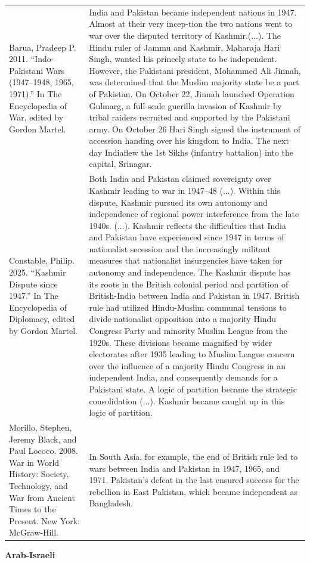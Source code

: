 {\begin{longtable}{p{}p{}}
Barua, Pradeep P. 2011. “Indo-Pakistani Wars (1947–1948, 1965, 1971).” In The Encyclopedia of War, edited by Gordon Martel. & India and Pakistan became independent nations in 1947. Almost at their very incep-tion the two nations went to war over the disputed territory of Kashmir.(...).
The Hindu ruler of Jammu and Kashmir, Maharaja Hari Singh, wanted his princely state to be independent. However, the Pakistani president, Mohammed Ali Jinnah, was determined that the Muslim majority state be a part of Pakistan. On October 22, Jinnah launched Operation Gulmarg, a full-scale guerilla invasion of Kashmir by tribal raiders recruited and supported by the Pakistani army. On October 26 Hari Singh signed the instrument of accession handing over his kingdom to India. The next day Indiaflew the 1st Sikhs (infantry battalion) into the capital, Srinagar.
\\
Constable, Philip. 2025. “Kashmir Dispute since 1947.” In The Encyclopedia of Diplomacy, edited by Gordon Martel. & Both India and Pakistan claimed sovereignty over Kashmir leading to war in 1947–48 (...). Within this dispute, Kashmir pursued its own autonomy and independence of regional power interference from the late 1940s. (...). Kashmir reflects the difficulties that India and Pakistan have experienced since 1947 in terms of nationalist secession and the increasingly militant measures that nationalist insurgencies have taken for autonomy and independence. The Kashmir dispute has its roots in the British colonial period and partition of British-India between India and Pakistan in 1947. British rule had utilized Hindu-Muslim communal tensions to divide nationalist opposition into a majority Hindu Congress Party and minority Muslim League from the 1920s. These divisions became magnified by wider electorates after 1935 leading to Muslim League concern over the influence of a majority Hindu Congress in an independent India, and consequently demands for a Pakistani state. A logic of partition became the strategic consolidation (...). Kashmir became caught up in this logic of partition.
\\
Morillo, Stephen, Jeremy Black, and Paul Lococo. 2008. War in World History: Society, Technology, and War from Ancient Times to the Present. New York: McGraw-Hill. & In South Asia, for example, the end of British rule led to wars between India and Pakistan in 1947, 1965, and 1971. Pakistan's defeat in the last ensured success for the rebellion in East Pakistan, which became independent as Bangladesh.
\\
\end{longtable}}
\clearpage
         \textbf{Arab-Israeli} 


